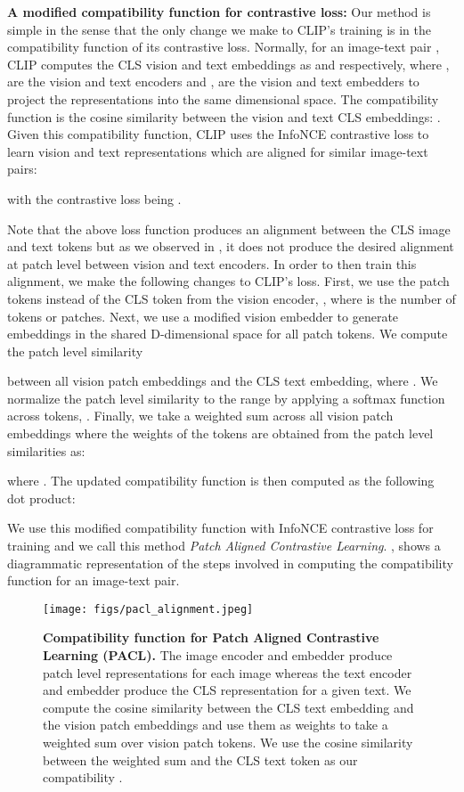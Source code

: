 \documentclass[10pt,twocolumn,letterpaper]{article}
\begin{document}
\textbf{A modified compatibility function for contrastive loss:} Our method is simple in the sense that the only change we make to CLIP's training is in the compatibility function of its contrastive loss. Normally, for an image-text pair , CLIP computes the CLS vision and text embeddings as  and  respectively, where ,  are the vision and text encoders and ,  are the vision and text embedders to project the representations into the same dimensional space. The compatibility function  is the cosine similarity between the vision and text CLS embeddings: . Given this compatibility function, CLIP uses the InfoNCE \cite{oord2018representation} contrastive loss to learn vision and text representations which are aligned for similar image-text pairs:

with the contrastive loss being .

Note that the above loss function produces an alignment between the CLS image and text tokens but as we observed in , it does not produce the desired alignment at patch level between vision and text encoders. In order to then train this alignment, we make the following changes to CLIP's loss. First, we use the patch tokens instead of the CLS token from the vision encoder, , where  is the number of tokens or patches. Next, we use a modified vision embedder  to generate embeddings in the shared D-dimensional space for all patch tokens. We compute the patch level similarity

between all vision patch embeddings and the CLS text embedding, where . We normalize the patch level similarity to the range  by applying a softmax function across tokens, . Finally, we take a weighted sum across all vision patch embeddings where the weights of the tokens are obtained from the patch level similarities  as:

where . The updated compatibility function  is then computed as the following dot product:


We use this modified compatibility function with InfoNCE contrastive loss for training and we call this method \emph{Patch Aligned Contrastive Learning}. , shows a diagrammatic representation of the steps involved in computing the compatibility function for an image-text pair.

\begin{figure*}[!t]
\centering
    \texttt{[image: figs/pacl\_alignment.jpeg]}
    \caption{\textbf{Compatibility function  for Patch Aligned Contrastive Learning (PACL).} The image encoder  and embedder  produce patch level representations for each image whereas the text encoder  and embedder  produce the CLS representation for a given text. We compute the cosine similarity between the CLS text embedding and the vision patch embeddings and use them as weights to take a weighted sum over vision patch tokens. We use the cosine similarity between the weighted sum and the CLS text token as our compatibility .}
    \vspace{-4mm}
    \label{fig:pacl_compatibility_function}
\end{figure*}
\end{document}
